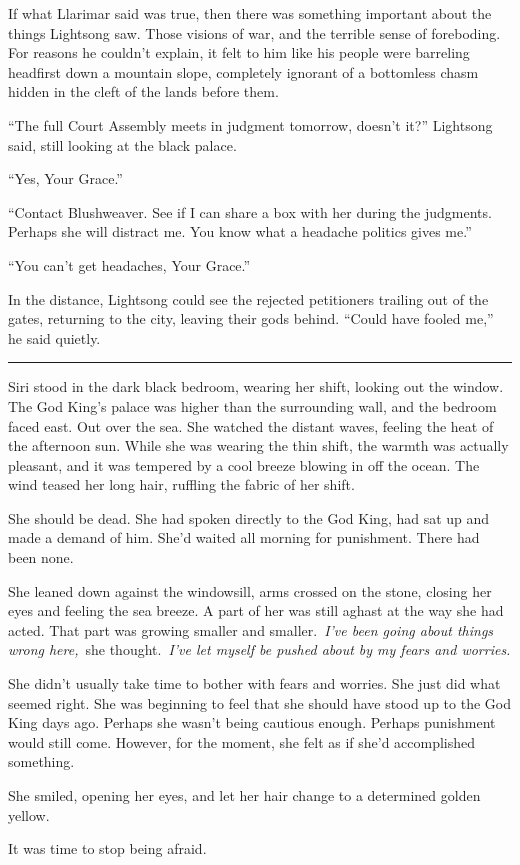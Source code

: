 If what Llarimar said was true, then there was something important about the things Lightsong saw. Those visions of war, and the terrible sense of foreboding. For reasons he couldn’t explain, it felt to him like his people were barreling headfirst down a mountain slope, completely ignorant of a bottomless chasm hidden in the cleft of the lands before them.

“The full Court Assembly meets in judgment tomorrow, doesn’t it?” Lightsong said, still looking at the black palace.

“Yes, Your Grace.”

“Contact Blushweaver. See if I can share a box with her during the judgments. Perhaps she will distract me. You know what a headache politics gives me.”

“You can’t get headaches, Your Grace.”

In the distance, Lightsong could see the rejected petitioners trailing out of the gates, returning to the city, leaving their gods behind. “Could have fooled me,” he said quietly.

\bigskip \hrule \bigskip

Siri stood in the dark black bedroom, wearing her shift, looking out the window. The God King’s palace was higher than the surrounding wall, and the bedroom faced east. Out over the sea. She watched the distant waves, feeling the heat of the afternoon sun. While she was wearing the thin shift, the warmth was actually pleasant, and it was tempered by a cool breeze blowing in off the ocean. The wind teased her long hair, ruffling the fabric of her shift.

She should be dead. She had spoken directly to the God King, had sat up and made a demand of him. She’d waited all morning for punishment. There had been none.

She leaned down against the windowsill, arms crossed on the stone, closing her eyes and feeling the sea breeze. A part of her was still aghast at the way she had acted. That part was growing smaller and smaller.~\textit{I’ve been going about things wrong here,}~she thought.~\textit{I’ve let myself be pushed about by my fears and worries.}

She didn’t usually take time to bother with fears and worries. She just did what seemed right. She was beginning to feel that she should have stood up to the God King days ago. Perhaps she wasn’t being cautious enough. Perhaps punishment would still come. However, for the moment, she felt as if she’d accomplished something.

She smiled, opening her eyes, and let her hair change to a determined golden yellow.

It was time to stop being afraid.

